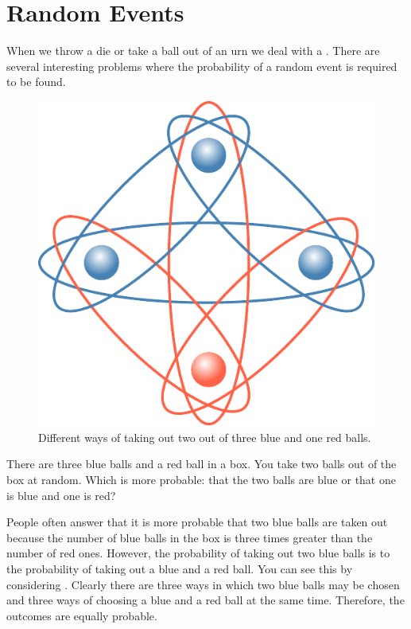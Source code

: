 \section{Random Events}

When we throw a die or take a ball out of an urn we deal with
a . There are several interesting problems where the
probability of a random event is required to be found.

\begin{figure}%
 \centering
 \includegraphics[width=\textwidth]{figures/three-balls.pdf}
\caption{Different ways of taking out two out of three blue and one
  red balls.\label{three-balls}}
\end{figure}


 There are three blue balls and a red
ball in a box. You take two balls out of the box at random. Which is
more probable: that the two balls are blue or that one is blue and one is
red?

People often answer that it is more probable that two blue balls are
taken out because the number of blue balls in the box is three times
greater than the number of red ones. However, the probability of taking
out two blue balls is  to the probability of taking out a blue and
a red ball. You can see this by considering . Clearly there are three ways in which two blue balls may be chosen and three ways of
choosing a blue and a red ball at the same time. Therefore, the
outcomes are equally probable.


